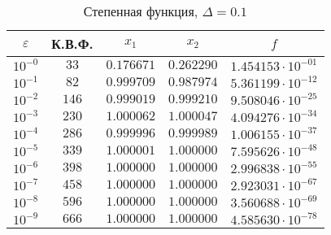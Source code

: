 \documentclass[a4paper,12pt,notitlepage,pdftex,headsepline]{scrartcl}
\begin{document}
        \begin{table}[ht]
          \centering
          \caption{Степенная функция, $\Delta = 0.1$}
          \begin{tabular}{|c|c|c|c|c|}
            \hline
            $\varepsilon$ & К.В.Ф. & $x_1$ & $x_2$ & $f$\\
            \hline
            $10^{-0}$ & $33$ & $0.176671$ & $0.262290$ & $1.454153\cdot 10^{-01}$\\
            $10^{-1}$ & $82$ & $0.999709$ & $0.987974$ & $5.361199\cdot 10^{-12}$\\
            $10^{-2}$ & $146$ & $0.999019$ & $0.999210$ & $9.508046\cdot 10^{-25}$\\
            $10^{-3}$ & $230$ & $1.000062$ & $1.000047$ & $4.094276\cdot 10^{-34}$\\
            $10^{-4}$ & $286$ & $0.999996$ & $0.999989$ & $1.006155\cdot 10^{-37}$\\
            $10^{-5}$ & $339$ & $1.000001$ & $1.000000$ & $7.595626\cdot 10^{-48}$\\
            $10^{-6}$ & $398$ & $1.000000$ & $1.000000$ & $2.996838\cdot 10^{-55}$\\
            $10^{-7}$ & $458$ & $1.000000$ & $1.000000$ & $2.923031\cdot 10^{-67}$\\
            $10^{-8}$ & $596$ & $1.000000$ & $1.000000$ & $3.560688\cdot 10^{-69}$\\
            $10^{-9}$ & $666$ & $1.000000$ & $1.000000$ & $4.585630\cdot 10^{-78}$\\
            \hline
          \end{tabular}
        \end{table}
\end{document}
